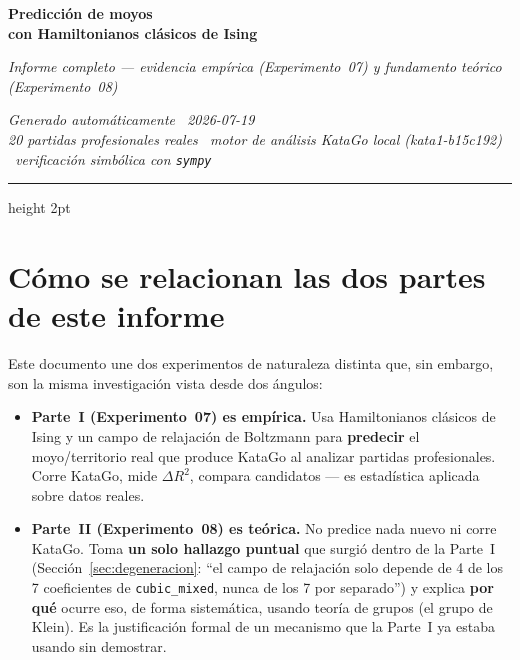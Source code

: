 \documentclass[11pt, a4paper]{article}
\begin{document}
\thispagestyle{fancy}

\vspace*{4pt}
{\color{cNavy}\Huge\bfseries Predicci\'on de moyos}\\[3pt]
{\color{cNavy}\Large\bfseries con Hamiltonianos cl\'asicos de Ising}

\vspace{6pt}
{\color{cMuted}\large\itshape
  Informe completo --- evidencia emp\'irica (Experimento~07) y
  fundamento te\'orico (Experimento~08)}

\vspace{4pt}
{\color{cMuted}\small\itshape Generado autom\'aticamente \textbullet\ 2026-07-19}\\[1pt]
{\color{cMuted}\small\itshape
  20 partidas profesionales reales \textbullet\ motor de an\'alisis KataGo local
  (kata1-b15c192) \textbullet\ verificaci\'on simb\'olica con \texttt{sympy}}

\vspace{8pt}
{\color{cAccent}\hrule height 2pt}
\vspace{10pt}

\section{C\'omo se relacionan las dos partes de este informe}
\label{sec:relacion}

Este documento une dos experimentos de naturaleza distinta que, sin
embargo, son la misma investigaci\'on vista desde dos \'angulos:

\begin{itemize}
  \item \textbf{Parte~I (Experimento~07) es emp\'irica.} Usa
  Hamiltonianos cl\'asicos de Ising y un campo de relajaci\'on de
  Boltzmann para \textbf{predecir} el moyo/territorio real que produce
  KataGo al analizar partidas profesionales. Corre KataGo, mide
  $\Delta R^2$, compara candidatos --- es estad\'istica aplicada sobre
  datos reales.

  \item \textbf{Parte~II (Experimento~08) es te\'orica.} No predice
  nada nuevo ni corre KataGo. Toma \textbf{un solo hallazgo puntual}
  que surgi\'o dentro de la Parte~I (Secci\'on~\ref{sec:degeneracion}:
  ``el campo de relajaci\'on solo depende de 4 de los 7 coeficientes de
  \texttt{cubic\_mixed}, nunca de los 7 por separado'') y explica
  \textbf{por qu\'e} ocurre eso, de forma sistem\'atica, usando teor\'ia
  de grupos (el grupo de Klein). Es la justificaci\'on formal de un
  mecanismo que la Parte~I ya estaba usando sin demostrar.
\end{itemize}
\end{document}
